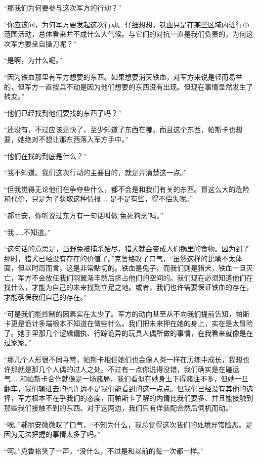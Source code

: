“那我们为何要参与这次军方的行动？”

“你应该问，为何军方要发起这次行动。仔细想想，铁血只是在某些区域内进行小范围活动，总体看来并不成什么大气候。与它们的对抗一直是我们负责的，为何这次军方要亲自操刀呢？”

“是啊，为什么呢。”

“因为铁血那里有军方想要的东西。如果想要消灭铁血，对军方来说是轻而易举的，但军方一直按兵不动是因为他们想要的东西没有出现。但现在事情显然发生了转变。”

“他们已经找到他们要找的东西了吗？”

“还没有，不过应该是快了，至少知道了东西在哪。而且这个东西，帕斯卡也想要，她绝对不想让那东西落入军方手中。”

“他们在找的到底是什么？”

“我不知道。我们这次行动的主要目的，就是弄清楚这一点。”

“但我觉得无论他们在争夺些什么，都不会是和我们有关的东西。冒这么大的危险和代价，只是为了获取这种情报……是不是有些，得不偿失呢。”

“郝丽安，你听说过东方有一句话叫做‘兔死狗烹’吗。”

“我……不知道。”

“这句话的意思是，当野兔被捕杀殆尽，猎犬就会变成人们锅里的食物。因为到了那时，猎犬已经没有存在的价值了。”克鲁格叹了口气，“虽然这样的比喻不太体面，但以时局而言，这是非常贴切的。铁血是兔子，而我们则是猎犬，铁血一旦灭亡，军方不会放任我们羽翼渐丰然后挤占他们的空间的。我们现在必须知道他们在找什么，才能为自己的未来找到立足之地。或者，我们也许需要保证铁血的存在，才能确保我们自己的存在。”

“可是我们能控制的因素实在太少了。军方的动向甚至从不向我们提前告知，帕斯卡更是诡计多端根本不知道在做些什么。我们把未来押在她的身上，实在是太冒险了。她手里那几个逻辑偏执、行踪诡异的玩具人偶所做的事情，在我看来就像是在过家家。”

“那几个人形很不同寻常，帕斯卡相信她们也会像人类一样在历练中成长，我想也许那就是那几个人偶的过人之处。不过有一点你说得没错，我们确实是在碰运气……和帕斯卡合作就像是一场赌局，我们看似在她身上下得赌注不多，但她一旦翻车，我们输进去的也许远不是我们能看到的这一点点。但我们已经没有其他的选择，军方根本不在乎我们的态度，而帕斯卡了解的内情比我们要多、并且能接触到那些我们接触不到的东西。对于这两边，我们只有佯装配合然后伺机而动。”

“唉。”郝丽安微微叹了口气，“不知为什么，我总觉得这次我们的处境异常险恶。是因为无法把握的事情太多了吗。”

“呵。”克鲁格笑了一声，“没什么，不过是和以前的每一次都一样。”

